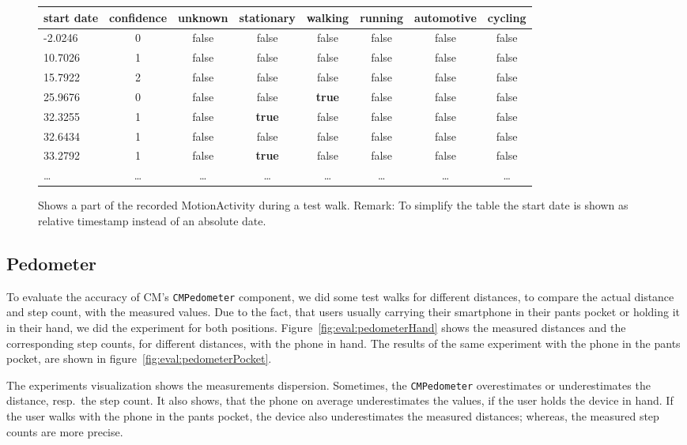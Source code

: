 \begin{figure}
\begin{tabular}{l*{7}{c}}
start date & confidence & unknown & stationary & walking & running & automotive & cycling \\
\hline
-2.0246 & 0 & false & false & false & false & false & false\\
10.7026 & 1 & false & false & false & false & false & false\\
15.7922 & 2 & false & false & false & false & false & false\\
25.9676 & 0 & false & false & \textbf{true} & false & false & false\\
32.3255 & 1 & false & \textbf{true} & false & false & false & false\\
32.6434 & 1 & false & false & false & false & false & false\\
33.2792 & 1 & false & \textbf{true} & false & false & false & false\\
\dots & \dots & \dots & \dots & \dots & \dots & \dots & \dots
\end{tabular}
\caption{Shows a part of the recorded MotionActivity during a test walk.
Remark: To simplify the table the start date is shown as relative timestamp instead of an absolute date.}
\label{fig:eval:motionActivity}
\end{figure}


\subsection{Pedometer}
To evaluate the accuracy of \ac{CM}'s \texttt{CMPedometer} component, we did some test walks for different distances, to compare the actual distance and step count, with the measured values. Due to the fact, that users usually carrying their smartphone in their pants pocket or holding it in their hand, we did the experiment for both positions. Figure~\ref{fig:eval:pedometerHand} shows the measured distances and the corresponding step counts, for different distances, with the phone in hand. The results of the same experiment with the phone in the pants pocket, are shown in figure~\ref{fig:eval:pedometerPocket}.

The experiments visualization shows the measurements dispersion. Sometimes, the \texttt{CMPedometer} overestimates or underestimates the distance, resp.\ the step count. It also shows, that the phone on average underestimates the values, if the user holds the device in hand. If the user walks with the phone in the pants pocket, the device also underestimates the measured distances; whereas, the measured step counts are more precise.

